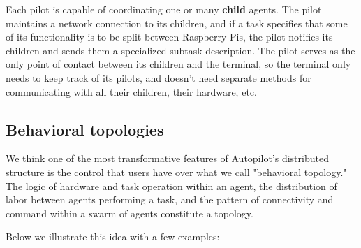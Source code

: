 Each pilot is capable of coordinating one or many \textbf{child} agents. The pilot maintains a network connection to its children, and if a task specifies that some of its functionality is to be split between Raspberry Pis, the pilot notifies its children and sends them a specialized subtask description. The pilot serves as the only point of contact between its children and the terminal, so the terminal only needs to keep track of its pilots, and doesn't need separate methods for communicating with all their children, their hardware, etc.

\subsection{Behavioral topologies}
\label{sec:topology}

We think one of the most transformative features of Autopilot's distributed structure is the control that users have over what we call "behavioral topology." The logic of hardware and task operation within an agent, the distribution of labor between agents performing a task, and the pattern of connectivity and command within a swarm of agents constitute a topology. 

Below we illustrate this idea with a few examples:

\clearpage

